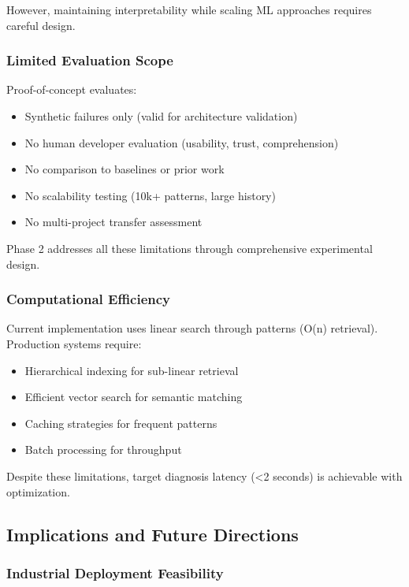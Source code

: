 \documentclass[11pt]{article}
\begin{document}
However, maintaining interpretability while scaling ML approaches requires careful design.

\subsubsection{Limited Evaluation Scope}

Proof-of-concept evaluates:
\begin{itemize}
    \item Synthetic failures only (valid for architecture validation)
    \item No human developer evaluation (usability, trust, comprehension)
    \item No comparison to baselines or prior work
    \item No scalability testing (10k+ patterns, large history)
    \item No multi-project transfer assessment
\end{itemize}

Phase 2 addresses all these limitations through comprehensive experimental design.

\subsubsection{Computational Efficiency}

Current implementation uses linear search through patterns (O(n) retrieval). Production systems require:
\begin{itemize}
    \item Hierarchical indexing for sub-linear retrieval
    \item Efficient vector search for semantic matching
    \item Caching strategies for frequent patterns
    \item Batch processing for throughput
\end{itemize}

Despite these limitations, target diagnosis latency (<2 seconds) is achievable with optimization.

\subsection{Implications and Future Directions}

\subsubsection{Industrial Deployment Feasibility}
\end{document}
